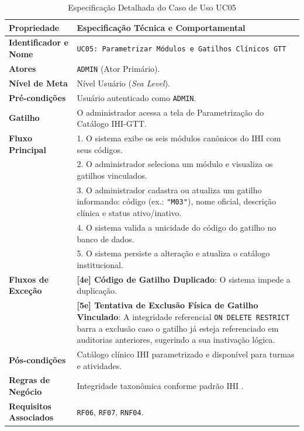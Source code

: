 \begin{table}[!ht]
\centering
\caption{Especificação Detalhada do Caso de Uso UC05}
\label{tab_uc05}
\footnotesize
\begin{tabularx}{\textwidth}{p{3.5cm} X}
\toprule
\textbf{Propriedade} & \textbf{Especificação Técnica e Comportamental} \\
\midrule
\textbf{Identificador e Nome} & \texttt{UC05: Parametrizar Módulos e Gatilhos Clínicos GTT} \\
\textbf{Atores} & \texttt{ADMIN} (Ator Primário). \\
\textbf{Nível de Meta} & Nível Usuário (\textit{Sea Level}). \\
\textbf{Pré-condições} & Usuário autenticado como \texttt{ADMIN}. \\
\textbf{Gatilho} & O administrador acessa a tela de Parametrização do Catálogo IHI-GTT. \\
\textbf{Fluxo Principal} & 
1. O sistema exibe os seis módulos canônicos do IHI com seus códigos.\\
& 2. O administrador seleciona um módulo e visualiza os gatilhos vinculados.\\
& 3. O administrador cadastra ou atualiza um gatilho informando: código (ex.: \texttt{"M03"}), nome oficial, descrição clínica e status ativo/inativo.\\
& 4. O sistema valida a unicidade do código do gatilho no banco de dados.\\
& 5. O sistema persiste a alteração e atualiza o catálogo institucional. \\
\textbf{Fluxos de Exceção} & 
\textbf{[4e] Código de Gatilho Duplicado}: O sistema impede a duplicação.\\
& \textbf{[5e] Tentativa de Exclusão Física de Gatilho Vinculado}: A integridade referencial \texttt{ON DELETE RESTRICT} barra a exclusão caso o gatilho já esteja referenciado em auditorias anteriores, sugerindo a sua inativação lógica. \\
\textbf{Pós-condições} & Catálogo clínico IHI parametrizado e disponível para turmas e atividades. \\
\textbf{Regras de Negócio} & Integridade taxonômica conforme padrão IHI \cite{ihi2009}. \\
\textbf{Requisitos Associados} & \texttt{RF06}, \texttt{RF07}, \texttt{RNF04}. \\
\bottomrule
\end{tabularx}
\end{table}


